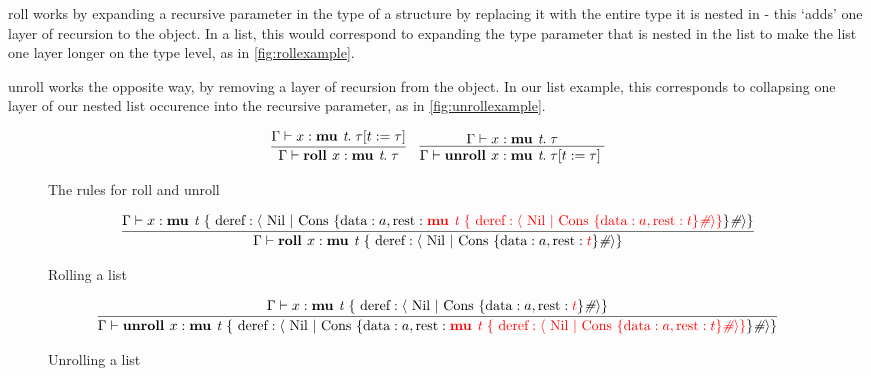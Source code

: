 \textsf{roll} works by expanding a recursive parameter 
in the type of a structure by replacing it with the entire type it is nested in - this `adds' one 
layer of recursion to the object. In a list, this would correspond to expanding the type parameter
that is nested in the list to make the list one layer longer on the type level, as in \autoref{fig:rollexample}.

\textsf{unroll} works the opposite way, by removing a layer of recursion from the object. In our
list example, this corresponds to collapsing one layer of our nested list occurence into the
recursive parameter, as in \autoref{fig:unrollexample}. 

\begin{figure}
    \centering
    \begin{align*}
        \infer{
            \Gamma \vdash \textbf{roll } x : \textbf{mu } \textit{t}.\; \tau
        }{
            \Gamma \vdash x : \textbf{mu } \textit{t}.\; \tau[ t := \tau]
        }
        && \infer{
            \Gamma \vdash \textbf{unroll } x : \textbf{mu } \textit{t}.\; \tau[ t := \tau]\; 
        }{
            \Gamma \vdash x : \textbf{mu } \textit{t}.\; \tau
        }
    \end{align*}
    \caption{The rules for roll and unroll}
    \label{def:rollunroll}
\end{figure}

\begin{figure}
    \centering
    \begin{align*}
        \infer{
            \Gamma \vdash \textbf{roll } x : \textbf{mu } \textit{t } \{ \text{ deref}: \langle \text{ Nil } \vert \text{ Cons } \{ \text{data}: a, \text{rest}: {\color{red} t} \}\textit{\#} \rangle \} 
        }{
            \Gamma \vdash x : \textbf{mu } \textit{t } \{ \text{ deref}: \langle \text{ Nil } \vert \text{ Cons } \{ \text{data}: a, \text{rest}: {\color{red} \textbf{mu } \textit{t } \{ \text{ deref}: \langle \text{ Nil } \vert \text{ Cons } \{ \text{data}: a, \text{rest}: t \}\textit{\#} \rangle \} } \}\textit{\#} \rangle \} 
        }
    \end{align*}
    \caption{Rolling a list}
    \label{fig:rollexample}
\end{figure}

\begin{figure}
    \centering
    \begin{align*}
        \infer{
            \Gamma \vdash \textbf{unroll } x : \textbf{mu } \textit{t } \{ \text{ deref}: \langle \text{ Nil } \vert \text{ Cons } \{ \text{data}: a, \text{rest}: {\color{red} \textbf{mu } \textit{t } \{ \text{ deref}: \langle \text{ Nil } \vert \text{ Cons } \{ \text{data}: a, \text{rest}: t \}\textit{\#} \rangle \} } \}\textit{\#} \rangle \} 
        }{
            \Gamma \vdash x : \textbf{mu } \textit{t } \{ \text{ deref}: \langle \text{ Nil } \vert \text{ Cons } \{ \text{data}: a, \text{rest}: {\color{red} t} \}\textit{\#} \rangle \} 
        }
    \end{align*}
    \caption{Unrolling a list}
    \label{fig:unrollexample}
\end{figure}

